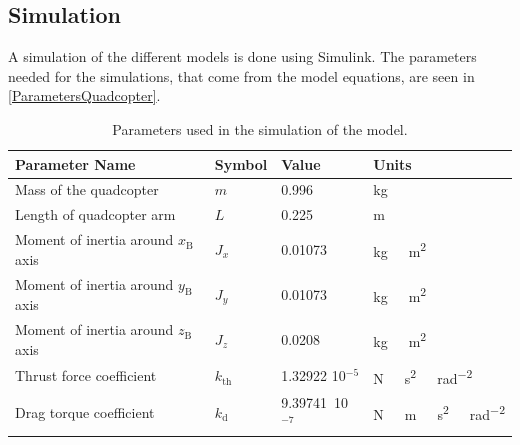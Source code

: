 \subsection{Simulation}
A simulation of the different models is done using Simulink. The parameters needed for the simulations, that come from the model equations, are seen in \autoref{ParametersQuadcopter}.
\begin{table}[H]
	\centering
	\begin{tabular}{|l|l|l|l|}
		\hline %
		\textbf{Parameter Name}         &\textbf{Symbol} &\textbf{Value}          &\textbf{Units}             \\
		\hline %
		Mass of the quadcopter          & $m$            & 0.996             & \si{kg}                   \\
		\hline %
    Length of quadcopter arm        & $L$            & 0.225            & \si{m}                    \\
    \hline %
		Moment of inertia around $x_{\mathrm{B}}$ axis & $J_x$          & 0.01073           & \si{kg\ m^2}              \\
		\hline %
		Moment of inertia around $y_{\mathrm{B}}$ axis & $J_y$          & 0.01073           & \si{kg\ m^2}              \\
		\hline %
		Moment of inertia around $z_{\mathrm{B}}$ axis & $J_z$          & 0.0208           & \si{kg\ m^2}              \\
		\hline %
		Thrust force coefficient        & $k_{\mathrm{th}}$       & 1.32922 10$^{-5}$  & \si{N\ s^2\ rad^{-2}}     \\
		\hline %
		Drag torque coefficient         & $k_{\mathrm{d}}$        & 9.39741\ 10$^{-7}$  & \si{N\ m\  s^2\ rad^{-2}} \\
		\hline %
	\end{tabular}
	\caption{Parameters used in the simulation of the model.}
	\label{ParametersQuadcopter}
\end{table}\vspace{-18pt}

